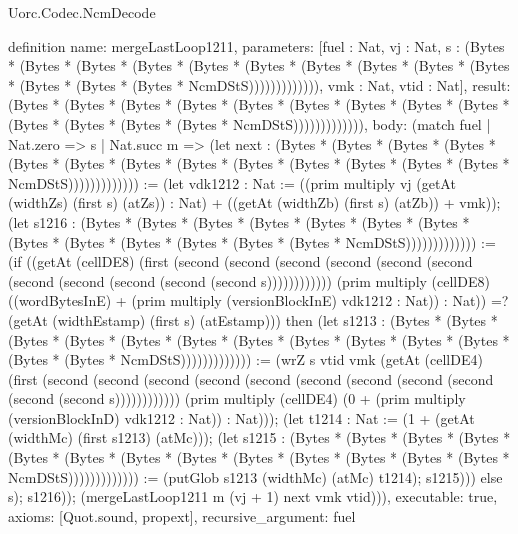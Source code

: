 \begin{lexlean}{Uorc.Codec.NcmDecode}
\begin{semanticmodule}
definition{
  name: mergeLastLoop1211,
  parameters: [fuel : Nat, vj : Nat, s : (Bytes * (Bytes * (Bytes * (Bytes * (Bytes * (Bytes * (Bytes * (Bytes * (Bytes * (Bytes * (Bytes * (Bytes * (Bytes * NcmDStS))))))))))))), vmk : Nat, vtid : Nat],
  result: (Bytes * (Bytes * (Bytes * (Bytes * (Bytes * (Bytes * (Bytes * (Bytes * (Bytes * (Bytes * (Bytes * (Bytes * (Bytes * NcmDStS))))))))))))),
  body: (match fuel
    | Nat.zero => s
    | Nat.succ m => (let next : (Bytes * (Bytes * (Bytes * (Bytes * (Bytes * (Bytes * (Bytes * (Bytes * (Bytes * (Bytes * (Bytes * (Bytes * (Bytes * NcmDStS))))))))))))) := (let vdk1212 : Nat := ((prim multiply vj (getAt (widthZs) (first s) (atZs)) : Nat) + ((getAt (widthZb) (first s) (atZb)) + vmk)); (let s1216 : (Bytes * (Bytes * (Bytes * (Bytes * (Bytes * (Bytes * (Bytes * (Bytes * (Bytes * (Bytes * (Bytes * (Bytes * (Bytes * NcmDStS))))))))))))) := (if ((getAt (cellDE8) (first (second (second (second (second (second (second (second (second (second (second (second s)))))))))))) (prim multiply (cellDE8) ((wordBytesInE) + (prim multiply (versionBlockInE) vdk1212 : Nat)) : Nat)) =? (getAt (widthEstamp) (first s) (atEstamp))) then (let s1213 : (Bytes * (Bytes * (Bytes * (Bytes * (Bytes * (Bytes * (Bytes * (Bytes * (Bytes * (Bytes * (Bytes * (Bytes * (Bytes * NcmDStS))))))))))))) := (wrZ s vtid vmk (getAt (cellDE4) (first (second (second (second (second (second (second (second (second (second (second (second s)))))))))))) (prim multiply (cellDE4) (0 + (prim multiply (versionBlockInD) vdk1212 : Nat)) : Nat))); (let t1214 : Nat := (1 + (getAt (widthMc) (first s1213) (atMc))); (let s1215 : (Bytes * (Bytes * (Bytes * (Bytes * (Bytes * (Bytes * (Bytes * (Bytes * (Bytes * (Bytes * (Bytes * (Bytes * (Bytes * NcmDStS))))))))))))) := (putGlob s1213 (widthMc) (atMc) t1214); s1215))) else s); s1216)); (mergeLastLoop1211 m (vj + 1) next vmk vtid))),
  executable: true,
  axioms: [Quot.sound, propext],
  recursive_argument: fuel
}


\end{semanticmodule}
\end{lexlean}
